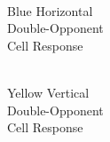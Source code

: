 \documentclass[journal,onecolumn]{IEEEtran}
\begin{document}
\begin{figure}[H]
\begin{subfigure}{0.15\textwidth}
        \caption{\\ Blue Horizontal\\ Double-Opponent\\ Cell Response}
    \end{subfigure}
    \begin{subfigure}{0.15\textwidth}
        \centering
        \captionsetup{justification=centering}
        \caption{\\ Yellow Vertical\\ Double-Opponent\\ Cell Response}
    \end{subfigure}%
    \par \bigskip%
    \begin{subfigure}{0.15\textwidth}
        \centering
        \captionsetup{justification=centering}

\end{subfigure}
\end{figure}
\end{document}
